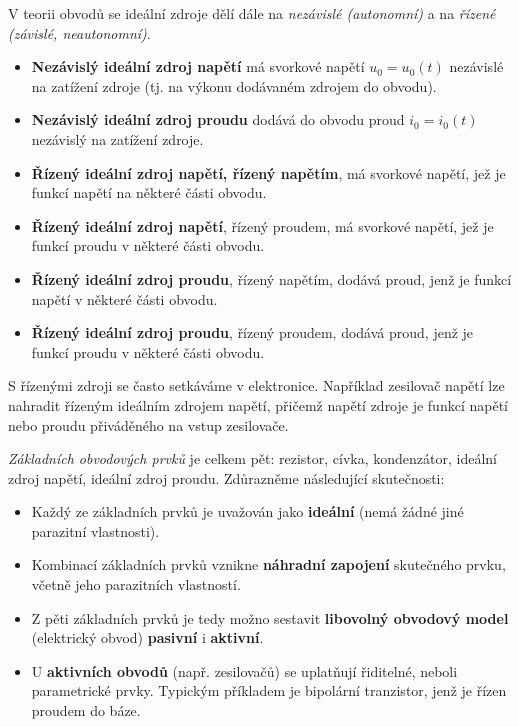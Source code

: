 {        V teorii obvodů se ideální zdroje dělí dále na \emph{nezávislé (autonomní)} a na 
        \emph{řízené (závislé, neautonomní)}.
        \begin{itemize}
          \item \textbf{Nezávislý ideální zdroj napětí} má svorkové napětí \(u_0 = u_0(t)\) 
                nezávislé na zatížení zdroje (tj. na výkonu dodávaném zdrojem do obvodu).
          \item \textbf{Nezávislý ideální zdroj proudu} dodává do obvodu proud \(i_0 = i_0(t)\) 
                nezávislý na zatížení zdroje.
          \item \textbf{Řízený ideální zdroj napětí, řízený napětím}, má svorkové napětí, jež je 
                funkcí napětí na některé části obvodu.
          \item \textbf{Řízený ideální zdroj napětí}, řízený proudem, má svorkové napětí, jež je 
                funkcí proudu v některé části obvodu.
          \item \textbf{Řízený ideální zdroj proudu}, řízený napětím, dodává proud, jenž je funkcí 
                napětí v některé části obvodu.
          \item \textbf{Řízený ideální zdroj proudu}, řízený proudem, dodává proud, jenž je funkcí 
                proudu v některé části obvodu.
        \end{itemize}
        
        S řízenými zdroji se často setkáváme v elektronice. Například zesilovač napětí lze nahradit 
        řízeným ideálním zdrojem napětí, přičemž napětí zdroje je funkcí napětí nebo proudu 
        přiváděného na vstup zesilovače.

        \emph{Základních obvodových prvků} je celkem pět: rezistor, cívka, kondenzátor, ideální 
        zdroj napětí, ideální zdroj proudu. Zdůrazněme následující skutečnosti:
        \begin{itemize}
          \itemsep0em 
          \item Každý ze základních prvků je uvažován jako \textbf{ideální} (nemá žádné jiné  
                parazitní vlastnosti).
          \item Kombinací základních prvků vznikne \textbf{náhradní zapojení} skutečného prvku, 
                včetně jeho parazitních vlastností.
          \item Z pěti základních prvků je tedy možno sestavit \textbf{libovolný obvodový model}
                (elektrický obvod) \textbf{pasivní} i \textbf{aktivní}.
          \item U \textbf{aktivních obvodů} (např. zesilovačů) se uplatňují řiditelné, neboli
                parametrické prvky. Typickým příkladem je bipolární tranzistor, jenž je řízen 
                proudem do báze.
        \end{itemize}
      
}
